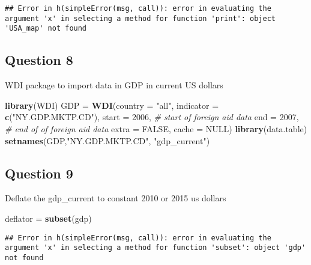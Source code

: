 \documentclass[
]{article}
\newenvironment{Shaded}{\begin{snugshade}}{\end{snugshade}}
\newcommand{\CommentTok}[1]{\textcolor[rgb]{0.56,0.35,0.01}{\textit{#1}}}
\newcommand{\DataTypeTok}[1]{\textcolor[rgb]{0.13,0.29,0.53}{#1}}
\newcommand{\DecValTok}[1]{\textcolor[rgb]{0.00,0.00,0.81}{#1}}
\newcommand{\KeywordTok}[1]{\textcolor[rgb]{0.13,0.29,0.53}{\textbf{#1}}}
\newcommand{\NormalTok}[1]{#1}
\newcommand{\OtherTok}[1]{\textcolor[rgb]{0.56,0.35,0.01}{#1}}
\newcommand{\StringTok}[1]{\textcolor[rgb]{0.31,0.60,0.02}{#1}}
\begin{document}
\begin{verbatim}
## Error in h(simpleError(msg, call)): error in evaluating the argument 'x' in selecting a method for function 'print': object 'USA_map' not found
\end{verbatim}

\hypertarget{question-8}{%
\subsection{Question 8}\label{question-8}}

WDI package to import data in GDP in current US dollars

\begin{Shaded}
\begin{Highlighting}[]
\KeywordTok{library}\NormalTok{(WDI)}
\NormalTok{GDP =}\StringTok{ }\KeywordTok{WDI}\NormalTok{(}\DataTypeTok{country =} \StringTok{"all"}\NormalTok{, }\DataTypeTok{indicator =} \KeywordTok{c}\NormalTok{(}\StringTok{"NY.GDP.MKTP.CD"}\NormalTok{),}
\DataTypeTok{start =} \DecValTok{2006}\NormalTok{, }\CommentTok{# start of foreign aid data}
\DataTypeTok{end =} \DecValTok{2007}\NormalTok{, }\CommentTok{# end of of foreign aid data}
\DataTypeTok{extra =} \OtherTok{FALSE}\NormalTok{, }\DataTypeTok{cache =} \OtherTok{NULL}\NormalTok{)}
\KeywordTok{library}\NormalTok{(data.table)}
\KeywordTok{setnames}\NormalTok{(GDP,}\StringTok{"NY.GDP.MKTP.CD"}\NormalTok{, }\StringTok{"gdp_current"}\NormalTok{)}
\end{Highlighting}
\end{Shaded}

\hypertarget{question-9}{%
\subsection{Question 9}\label{question-9}}

Deflate the gdp\_current to constant 2010 or 2015 us dollars

\begin{Shaded}
\begin{Highlighting}[]
\NormalTok{deflator =}\StringTok{ }\KeywordTok{subset}\NormalTok{(gdp)}
\end{Highlighting}
\end{Shaded}

\begin{verbatim}
## Error in h(simpleError(msg, call)): error in evaluating the argument 'x' in selecting a method for function 'subset': object 'gdp' not found
\end{verbatim}
\end{document}
